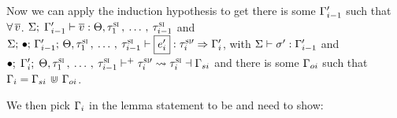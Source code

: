 Now we can apply the induction hypothesis to get there is some
$\oxvarctx_{i-1}^\prime$ such that $\forall\, \overline{\oxvalue}$.
$\oxwfkontctx{\oxglobalctx}{\oxvarctx_{i-1}^\prime}{\overline{\oxvalue}}
{\oxkontctx, \oxsitype_1 \oxdotsc \oxsitype_{i-1}}$ and
$\oxtypjudge{\oxglobalctx}{\oxemptyctx}{\oxkontctx, \oxsitype_1 \oxdotsc \oxsitype_{i-1}}{\oxvarctx_{i-1}^{\prime}}
{\oxexpr_i^{\prime}}{\oxtype_i^{\textsc{si} \prime}}{\oxvarctx_i^{\prime}}$,
with $\oxstorevalidity{\oxglobalctx}{\oxvarctx_{i-1}^\prime}{\oxstore^\prime}$
and $\oxtunify[\oxcombine]{\oxemptyctx}{\oxkontctx, \oxsitype_1 \oxdotsc \oxsitype_{i-1}}{\oxvarctx_i^\prime}
{\oxtype_i^{\textsc{si}\prime}}{\oxsitype_i}{\oxvarctx_{si}}$ and there is some
$\oxvarctx_{oi}$ such that $\oxvarctx_i = \oxvarctx_{si} \oxintersect \oxvarctx_{oi}$.

We then pick $\oxvarctx_i$ in the lemma statement to be
 and need to show:


